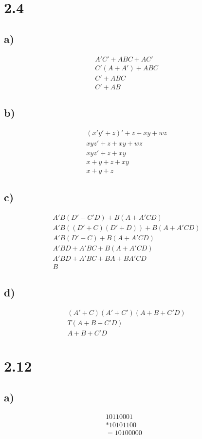 \documentclass{article}
\begin{document}
\newpage
\section*{2.4}
\subsection*{a)}
\begin{align*}
    A'C'+ABC+AC'\\
    C'(A+A')+ABC\\
    C'+ABC\\
    C'+AB
\end{align*}

\subsection*{b)}
\begin{align*}
    (x'y'+z)'+z+xy+wz\\
    xyz'+z+xy+wz\\
    xyz'+z+xy\\
    x+y+z+xy\\
    x+y+z
\end{align*}

\subsection*{c)}
\begin{align*}
    A'B(D'+C'D)+B(A+A'CD)\\
    A'B((D'+C)(D'+D))+B(A+A'CD)\\
    A'B(D'+C)+B(A+A'CD)\\
    A'BD+A'BC+B(A+A'CD)\\
    A'BD+A'BC+BA+BA'CD\\
    B
\end{align*}

\subsection*{d)}
\begin{align*}
    (A'+C)(A'+C')(A+B+C'D)\\
    T(A+B+C'D)\\
    A+B+C'D
\end{align*}

\section*{2.12}
\subsection*{a)}
\begin{align*}
    10110001&\\
    *10101100&\\
    =10100000
\end{align*}
\end{document}
